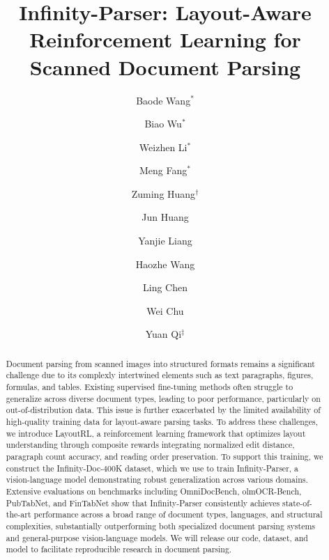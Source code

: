 \documentclass{article} %
\author[1]{Baode Wang$^{*}$}
\author[2]{Biao Wu$^{*}$}
\author[1]{Weizhen Li$^{*}$}
\author[3]{Meng Fang$^{*}$}
\author[1]{Zuming Huang$^{\dagger}$}
\author[1]{Jun Huang}
\author[1]{Yanjie Liang}
\author[1]{Haozhe Wang}
\author[2]{Ling Chen}
\author[1]{Wei Chu}
\author[1]{Yuan Qi$^{\ddagger}$}
\affil[1]{INFLY Tech}
\affil[2]{Australian Artificial Intelligence Institute}
\affil[3]{University of Liverpool}
\title{Infinity-Parser: Layout-Aware Reinforcement Learning for Scanned Document Parsing}
\begin{document}
\maketitle
\begingroup
\renewcommand{\thefootnote}{\fnsymbol{footnote}}
\endgroup



\begin{abstract}

Document parsing from scanned images into structured formats remains a significant challenge due to its complexly intertwined elements such as text paragraphs, figures, formulas, and tables. Existing supervised fine-tuning methods often struggle to generalize across diverse document types, leading to poor performance, particularly on out-of-distribution data. This issue is further exacerbated by the limited availability of high-quality training data for layout-aware parsing tasks. To address these challenges, we introduce LayoutRL, a reinforcement learning framework that optimizes layout understanding through composite rewards integrating normalized edit distance, paragraph count accuracy, and reading order preservation. To support this training, we construct the Infinity-Doc-400K dataset, which we use to train Infinity-Parser, a vision-language model demonstrating robust generalization across various domains. Extensive evaluations on benchmarks including OmniDocBench, olmOCR-Bench, PubTabNet, and FinTabNet show that Infinity-Parser consistently achieves state-of-the-art performance across a broad range of document types, languages, and structural complexities, substantially outperforming both specialized document parsing systems and general-purpose vision-language models. We will release our code, dataset, and model to facilitate reproducible research in document parsing.


\end{abstract}
\end{document}
